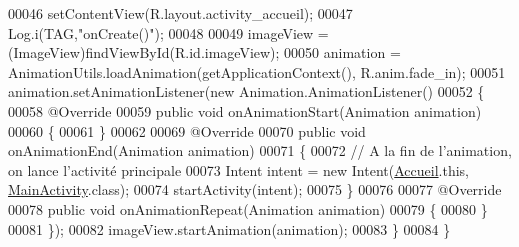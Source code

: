 \begin{DoxyCode}
00046         setContentView(R.layout.activity\_accueil);
00047         Log.i(TAG,\textcolor{stringliteral}{"onCreate()"});
00048 
00049         imageView = (ImageView)findViewById(R.id.imageView);
00050         animation = AnimationUtils.loadAnimation(getApplicationContext(), R.anim.fade\_in);
00051         animation.setAnimationListener(\textcolor{keyword}{new} Animation.AnimationListener()
00052         \{
00058             @Override
00059             \textcolor{keyword}{public} \textcolor{keywordtype}{void} onAnimationStart(Animation animation)
00060             \{
00061             \}
00062 
00069             @Override
00070             \textcolor{keyword}{public} \textcolor{keywordtype}{void} onAnimationEnd(Animation animation)
00071             \{
00072                 \textcolor{comment}{// A la fin de l'animation, on lance l'activité principale}
00073                 Intent intent = \textcolor{keyword}{new} Intent(\hyperlink{classcom_1_1lasalle_1_1io__trucks_1_1_accueil}{Accueil}.this, \hyperlink{classcom_1_1lasalle_1_1io__trucks_1_1_main_activity}{MainActivity}.class);
00074                 startActivity(intent);
00075             \}
00076 
00077             @Override
00078             \textcolor{keyword}{public} \textcolor{keywordtype}{void} onAnimationRepeat(Animation animation)
00079             \{
00080             \}
00081         \});
00082         imageView.startAnimation(animation);
00083     \}
00084 \}
\end{DoxyCode}
